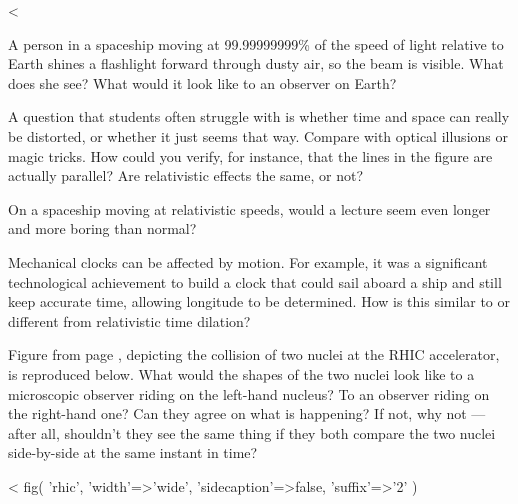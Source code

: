   <%

\vfill

\startdqs
\begin{dq}
A person in a spaceship moving at 99.99999999\% of the
speed of light relative to Earth shines a flashlight forward
through dusty air, so the beam is visible. What does she
see? What would it look like to an observer on Earth?
\end{dq}

\vspace{m4_ifelse(__me,1,5,0)mm}

\begin{dq}\label{dq:illusion}
A question that students often struggle with is whether
time and space can really be distorted, or whether it just
seems that way. Compare with optical illusions or magic
tricks. How could you verify, for instance, that the lines
in the figure are actually parallel? Are relativistic
effects the same, or not?
\end{dq}

\vspace{m4_ifelse(__me,1,5,0)mm}

\begin{dq}
On a spaceship moving at relativistic speeds, would a
lecture seem even longer and more boring than normal?
\end{dq}

\vspace{m4_ifelse(__me,1,5,0)mm}

\begin{dq}
Mechanical clocks can be affected by motion. For example,
it was a significant technological achievement to build a
clock that could sail aboard a ship and still keep accurate
time, allowing longitude to be determined. How is this
similar to or different from relativistic time dilation?
\end{dq}

\begin{dq}\label{dq:rhic}
Figure  from page \pageref{fig:rhic}, depicting the collision of
two nuclei at the RHIC accelerator, is reproduced below.
What would the shapes of the two nuclei
look like to a microscopic observer riding on the
left-hand nucleus? To an observer riding on the right-hand
one? Can they agree on what is happening? If not, why not
--- after all, shouldn't they see the same thing if they
both compare the two nuclei side-by-side at the same instant in time?
\end{dq}
<%
  fig(
    'rhic',
    {
      'width'=>'wide',
      'sidecaption'=>false,
      'suffix'=>'2'
    }
  )

